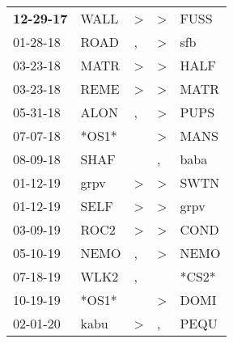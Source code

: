 \begin{supertabular}{p{0.07\textwidth}p{0.06\textwidth}p{0.02\textwidth}p{0.02\textwidth}p{0.06\textwidth}}
 \textbf{12-29-17\textsuperscript{}} &           WALL\textsuperscript{} &     \textgreater &     \textgreater &           FUSS\textsuperscript{} \\
          01-28-18\textsuperscript{} &           ROAD\textsuperscript{} &                , &     \textgreater &            sfb\textsuperscript{} \\
          03-23-18\textsuperscript{} &           MATR\textsuperscript{} &     \textgreater &     \textgreater &           HALF\textsuperscript{} \\
          03-23-18\textsuperscript{} &           REME\textsuperscript{} &     \textgreater &     \textgreater &           MATR\textsuperscript{} \\
          05-31-18\textsuperscript{} &           ALON\textsuperscript{} &                , &     \textgreater &           PUPS\textsuperscript{} \\
          07-07-18\textsuperscript{} &                            *OS1* &                  &     \textgreater &           MANS\textsuperscript{} \\
          08-09-18\textsuperscript{} &           SHAF\textsuperscript{} &                  &                , &           baba\textsuperscript{} \\
          01-12-19\textsuperscript{} &           grpv\textsuperscript{} &     \textgreater &     \textgreater &           SWTN\textsuperscript{} \\
          01-12-19\textsuperscript{} &           SELF\textsuperscript{} &     \textgreater &     \textgreater &           grpv\textsuperscript{} \\
          03-09-19\textsuperscript{} &           ROC2\textsuperscript{} &     \textgreater &     \textgreater &           COND\textsuperscript{} \\
          05-10-19\textsuperscript{} &           NEMO\textsuperscript{} &                , &     \textgreater &           NEMO\textsuperscript{} \\
          07-18-19\textsuperscript{} &           WLK2\textsuperscript{} &                , &                  &                            *CS2* \\
          10-19-19\textsuperscript{} &                            *OS1* &                  &     \textgreater &           DOMI\textsuperscript{} \\
          02-01-20\textsuperscript{} &           kabu\textsuperscript{} &     \textgreater &                , &           PEQU\textsuperscript{} \\
\end{supertabular}
